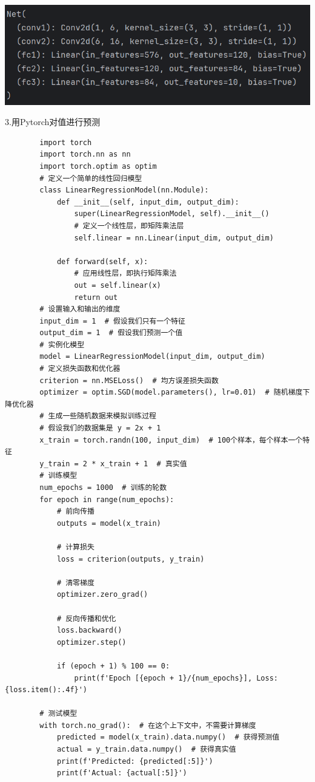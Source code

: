 \documentclass{article}
\begin{document}
\noindent
\begin{minipage}{\linewidth}
	\centering
	\includegraphics[width=0.5\linewidth]{py2.png}
	\label{fig:example}
\end{minipage}

3.用Pytorch对值进行预测
\begin{verbatim}
        import torch
        import torch.nn as nn
        import torch.optim as optim
        # 定义一个简单的线性回归模型
        class LinearRegressionModel(nn.Module):
            def __init__(self, input_dim, output_dim):
                super(LinearRegressionModel, self).__init__()
                # 定义一个线性层，即矩阵乘法层
                self.linear = nn.Linear(input_dim, output_dim)

            def forward(self, x):
                # 应用线性层，即执行矩阵乘法
                out = self.linear(x)
                return out
        # 设置输入和输出的维度
        input_dim = 1  # 假设我们只有一个特征
        output_dim = 1  # 假设我们预测一个值
        # 实例化模型
        model = LinearRegressionModel(input_dim, output_dim)
        # 定义损失函数和优化器
        criterion = nn.MSELoss()  # 均方误差损失函数
        optimizer = optim.SGD(model.parameters(), lr=0.01)  # 随机梯度下降优化器
        # 生成一些随机数据来模拟训练过程
        # 假设我们的数据集是 y = 2x + 1
        x_train = torch.randn(100, input_dim)  # 100个样本，每个样本一个特征
        y_train = 2 * x_train + 1  # 真实值
        # 训练模型
        num_epochs = 1000  # 训练的轮数
        for epoch in range(num_epochs):
            # 前向传播
            outputs = model(x_train)

            # 计算损失
            loss = criterion(outputs, y_train)

            # 清零梯度
            optimizer.zero_grad()

            # 反向传播和优化
            loss.backward()
            optimizer.step()

            if (epoch + 1) % 100 == 0:
                print(f'Epoch [{epoch + 1}/{num_epochs}], Loss: {loss.item():.4f}')

        # 测试模型
        with torch.no_grad():  # 在这个上下文中，不需要计算梯度
            predicted = model(x_train).data.numpy()  # 获得预测值
            actual = y_train.data.numpy()  # 获得真实值
            print(f'Predicted: {predicted[:5]}')
            print(f'Actual: {actual[:5]}')

\end{verbatim}
\end{document}
